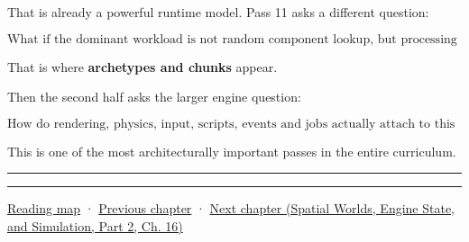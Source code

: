 That is already a powerful runtime model. Pass 11 asks a different question:

\[
\boxed{
\text{What if the dominant workload is not random component lookup, but processing huge groups of identically shaped entities?}
}
\]

That is where \textbf{archetypes and chunks} appear.

Then the second half asks the larger engine question:

\[
\boxed{
\text{How do rendering, physics, input, scripts, events and jobs actually attach to this ECS without destroying its data-oriented properties?}
}
\]

This is one of the most architecturally important passes in the entire curriculum.

\begin{center}\rule{0.5\linewidth}{0.5pt}\end{center}

\begin{center}\rule{0.5\linewidth}{0.5pt}\end{center}

\hyperref[volume-reading-map]{Reading map} · \hyperref[05-engine-i-ch014-application-clocks-and-stable-input-identity]{Previous chapter} · \href{../05-Spatial-Worlds-Engine-State-and-Simulation-P02/main.pdf\#nameddest=05-engine-i-ch016-archetypes-chunks-relationships-and-transforms}{Next chapter (Spatial Worlds, Engine State, and Simulation, Part 2, Ch. 16)}
